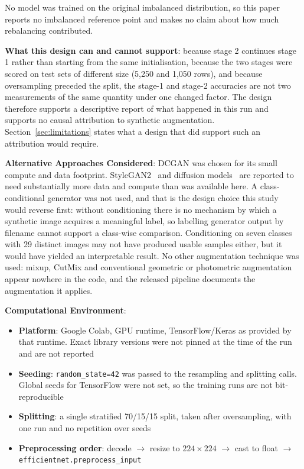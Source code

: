 \documentclass[ai,article,submit,pdftex,moreauthors]{Definitions/mdpi}
\begin{document}
No model was trained on the original imbalanced distribution, so this paper reports no imbalanced reference point and makes no claim about how much rebalancing contributed.

\textbf{What this design can and cannot support}: because stage 2 continues stage 1 rather than starting from the same initialisation, because the two stages were scored on test sets of different size (5,250 and 1,050 rows), and because oversampling preceded the split, the stage-1 and stage-2 accuracies are not two measurements of the same quantity under one changed factor. The design therefore supports a descriptive report of what happened in this run and supports no causal attribution to synthetic augmentation. Section~\ref{sec:limitations} states what a design that did support such an attribution would require.

\textbf{Alternative Approaches Considered}: DCGAN was chosen for its small compute and data footprint. StyleGAN2~\cite{karras2020} and diffusion models~\cite{ho2020} are reported to need substantially more data and compute than was available here. A class-conditional generator was not used, and that is the design choice this study would reverse first: without conditioning there is no mechanism by which a synthetic image acquires a meaningful label, so labelling generator output by filename cannot support a class-wise comparison. Conditioning on seven classes with 29 distinct images may not have produced usable samples either, but it would have yielded an interpretable result. No other augmentation technique was used: mixup, CutMix and conventional geometric or photometric augmentation appear nowhere in the code, and the released pipeline documents the augmentation it applies.

\textbf{Computational Environment}:
\begin{itemize}[leftmargin=*, itemsep=2pt]
    \item \textbf{Platform}: Google Colab, GPU runtime, TensorFlow/Keras as provided by that runtime. Exact library versions were not pinned at the time of the run and are not reported
    \item \textbf{Seeding}: \texttt{random\_state=42} was passed to the resampling and splitting calls. Global seeds for TensorFlow were not set, so the training runs are not bit-reproducible
    \item \textbf{Splitting}: a single stratified 70/15/15 split, taken after oversampling, with one run and no repetition over seeds
    \item \textbf{Preprocessing order}: decode $\rightarrow$ resize to $224 \times 224$ $\rightarrow$ cast to float $\rightarrow$ \texttt{efficientnet.preprocess\_input}
\end{itemize}
\end{document}

